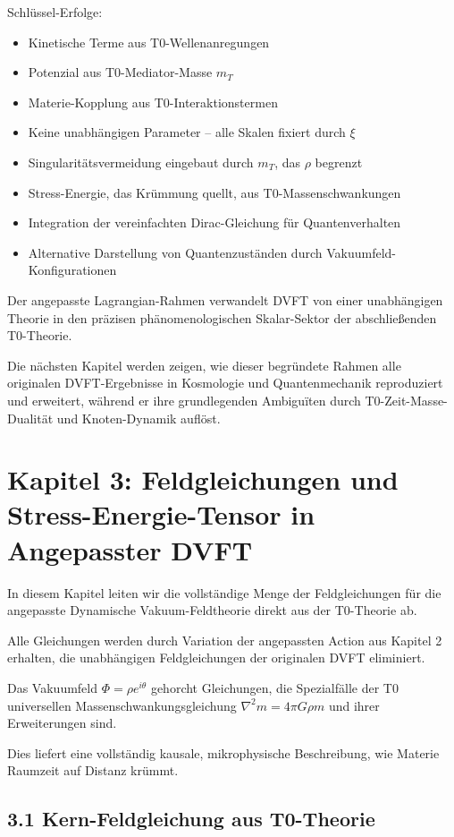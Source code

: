 \documentclass[12pt,a4paper]{article}
\begin{document}
	Schlüssel-Erfolge:
	\begin{itemize}
		\item Kinetische Terme aus T0-Wellenanregungen
		\item Potenzial aus T0-Mediator-Masse $m_T$
		\item Materie-Kopplung aus T0-Interaktionstermen
		\item Keine unabhängigen Parameter – alle Skalen fixiert durch $\xi$
		\item Singularitätsvermeidung eingebaut durch $m_T$, das $\rho$ begrenzt
		\item Stress-Energie, das Krümmung quellt, aus T0-Massenschwankungen
		\item Integration der vereinfachten Dirac-Gleichung für Quantenverhalten
		\item Alternative Darstellung von Quantenzuständen durch Vakuumfeld-Konfigurationen
	\end{itemize}
	
	Der angepasste Lagrangian-Rahmen verwandelt DVFT von einer unabhängigen Theorie in den präzisen phänomenologischen Skalar-Sektor der abschließenden T0-Theorie.
	
	Die nächsten Kapitel werden zeigen, wie dieser begründete Rahmen alle originalen DVFT-Ergebnisse in Kosmologie und Quantenmechanik reproduziert und erweitert, während er ihre grundlegenden Ambiguïten durch T0-Zeit-Masse-Dualität und Knoten-Dynamik auflöst.
	
	\section{Kapitel 3: Feldgleichungen und Stress-Energie-Tensor in Angepasster DVFT}
	
	In diesem Kapitel leiten wir die vollständige Menge der Feldgleichungen für die angepasste Dynamische Vakuum-Feldtheorie direkt aus der T0-Theorie ab.
	
	Alle Gleichungen werden durch Variation der angepassten Action aus Kapitel 2 erhalten, die unabhängigen Feldgleichungen der originalen DVFT eliminiert.
	
	Das Vakuumfeld $\Phi = \rho e^{i\theta}$ gehorcht Gleichungen, die Spezialfälle der T0 universellen Massenschwankungsgleichung $\nabla^2 m = 4\pi G \rho m$ und ihrer Erweiterungen sind.
	
	Dies liefert eine vollständig kausale, mikrophysische Beschreibung, wie Materie Raumzeit auf Distanz krümmt.
	
	\subsection{3.1 Kern-Feldgleichung aus T0-Theorie}
	
\end{document}
